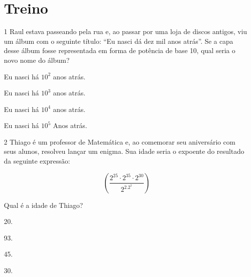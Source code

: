 \section*{Treino}

\num{1} Raul estava passeando pela rua e, ao passar por uma loja de discos
antigos, viu um álbum com o seguinte título: ``Eu nasci dá dez mil anos
atrás''. Se a capa desse álbum fosse representada em forma de potência
de base 10, qual seria o novo nome do álbum?

\begin{escolha}[itemsep=0pt]
\item Eu nasci há $10^2$ anos atrás.
\item Eu nasci há $10^3$ anos atrás.
\item Eu nasci há $10^4$ anos atrás.
\item Eu nasci há $10^5$ Anos atrás.
\end{escolha}









\num{2} Thiago é um professor de Matemática e, ao comemorar seu aniversário
com seus alunos, resolveu lançar um enigma. Sua idade seria o expoente
do resultado da seguinte expressão:

$$(\frac{2^{25} \cdot 2^{35} \cdot 2^{30}} {2^2.2^1})$$

Qual é a idade de Thiago?

\begin{escolha}[itemsep=0pt]
\item 20.
\item 93.
\item 45.
\item 30.
\end{escolha}


